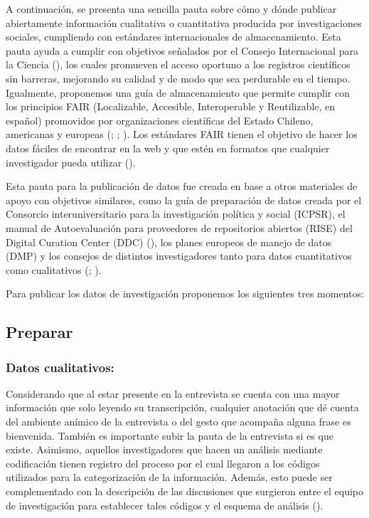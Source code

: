 \documentclass[
  spanish,
  a4paper,
  oneside]{scrbook}
\begin{document}
A continuación, se presenta una sencilla pauta sobre cómo y dónde
publicar abiertamente información cualitativa o cuantitativa producida
por investigaciones sociales, cumpliendo con estándares internacionales
de almacenamiento. Esta pauta ayuda a cumplir con objetivos señalados
por el Consejo Internacional para la Ciencia
(), los cuales promueven el
acceso oportuno a los registros científicos sin barreras, mejorando su
calidad y de modo que sea perdurable en el tiempo. Igualmente,
proponemos una guía de almacenamiento que permite cumplir con los
principios FAIR (Localizable, Accesible, Interoperable y Reutilizable,
en español) promovidos por organizaciones científicas del Estado
Chileno, americanas y europeas (; ;
). Los estándares FAIR tienen el
objetivo de hacer los datos fáciles de encontrar en la web y que estén
en formatos que cualquier investigador pueda utilizar
().

Esta pauta para la publicación de datos fue creada en base a otros
materiales de apoyo con objetivos similares, como la guía de preparación
de datos creada por el Consorcio interuniversitario para la
investigación política y social (ICPSR), el manual de Autoevaluación
para proveedores de repositorios abiertos (RISE) del Digital Curation
Center (DDC) (), los planes
europeos de manejo de datos (DMP) y los consejos de distintos
investigadores tanto para datos cuantitativos como cualitativos
(;
).

Para publicar los datos de investigación proponemos los siguientes tres
momentos:

\subsection{Preparar}\label{preparar}

\subsubsection{Datos cualitativos:}\label{datos-cualitativos}

Considerando que al estar presente en la entrevista se cuenta con una
mayor información que solo leyendo su transcripción, cualquier anotación
que dé cuenta del ambiente anímico de la entrevista o del gesto que
acompaña alguna frase es bienvenida. También es importante subir la
pauta de la entrevista si es que existe. Asimismo, aquellos
investigadores que hacen un análisis mediante codificación tienen
registro del proceso por el cual llegaron a los códigos utilizados para
la categorización de la información. Además, esto puede ser
complementado con la descripción de las discusiones que surgieron entre
el equipo de investigación para establecer tales códigos y el esquema de
análisis ().
\end{document}
